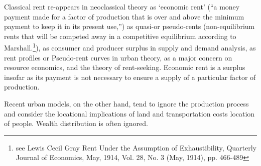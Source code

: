 


Classical rent re-appears in neoclassical theory as `economic rent' (``a money payment made for a factor of production that is over and above the minimum payment to keep it in its present use,'')  as quasi-or pseudo-rents (non-equilibrium rents that will be competed away in a competitive equilibrium according to Marshall.\footnote{see Lewis Cecil Gray Rent Under the Assumption of Exhaustibility, Quarterly Journal of Economics, May, 1914, Vol. 28, No. 3 (May, 1914), pp. 466-489}),  as consumer  and producer surplus in supply and demand analysis,  as rent profiles or Pseudo-rent curves in urban theory, as a major concern on resource economics, and the theory of rent-seeking. Economic rent is a surplus insofar as its payment is not necessary to ensure a supply of a particular factor of production. 







Recent urban models, on the other hand, tend to ignore the production process and consider the locational implications of land and transportation costs location of people. Wealth distribution is often ignored. 

